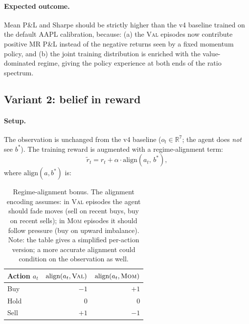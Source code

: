 \documentclass[11pt]{article}
\begin{document}
\paragraph{Expected outcome.}
Mean P\&L and Sharpe should be strictly higher than the v4 baseline
trained on the default AAPL calibration, because:
(a) the \textsc{Val} episodes now contribute positive MR P\&L instead of
the negative returns seen by a fixed momentum policy, and
(b) the joint training distribution is enriched with the value-dominated
regime, giving the policy experience at both ends of the ratio spectrum.

\subsection{Variant 2: belief in reward}

\paragraph{Setup.}
The observation is unchanged from the v4 baseline ($o_t \in \mathbb{R}^7$;
the agent does \emph{not} see $b^*$).
The training reward is augmented with a regime-alignment term:
\[
  \tilde{r}_t = r_t + \alpha \cdot \text{align}(a_t,\, b^*),
\]
where $\text{align}(a, b^*)$ is:

\begin{table}[H]
\centering
\begin{tabular}{lrr}
\toprule
Action $a_t$ &
  $\text{align}(a_t, \textsc{Val})$ &
  $\text{align}(a_t, \textsc{Mom})$ \\
\midrule
Buy  & $-1$ & $+1$ \\
Hold & $\phantom{-}0$ & $\phantom{+}0$ \\
Sell & $+1$ & $-1$ \\
\bottomrule
\end{tabular}
\caption{Regime-alignment bonus. The alignment encoding assumes:
         in \textsc{Val} episodes the agent should fade moves (sell on
         recent buys, buy on recent sells); in \textsc{Mom} episodes it
         should follow pressure (buy on upward imbalance).
         Note: the table gives a simplified per-action version; a
         more accurate alignment could condition on the observation as
         well.}
\label{tab:alignment}
\end{table}
\end{document}
